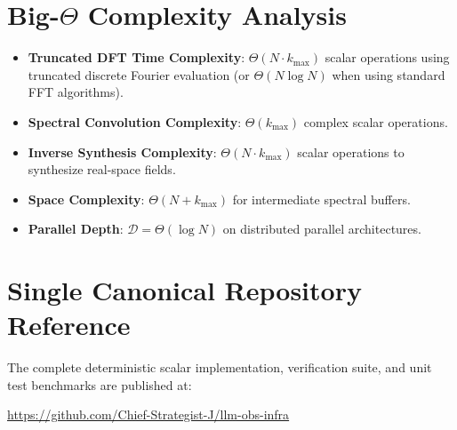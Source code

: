 \documentclass[11pt,a4paper]{article}
\theoremstyle{definition}
\begin{document}
\section{Big-$\Theta$ Complexity Analysis}

\begin{itemize}
    \item \textbf{Truncated DFT Time Complexity}: $\Theta(N \cdot k_{\max})$ scalar operations using truncated discrete Fourier evaluation (or $\Theta(N \log N)$ when using standard FFT algorithms).
    \item \textbf{Spectral Convolution Complexity}: $\Theta(k_{\max})$ complex scalar operations.
    \item \textbf{Inverse Synthesis Complexity}: $\Theta(N \cdot k_{\max})$ scalar operations to synthesize real-space fields.
    \item \textbf{Space Complexity}: $\Theta(N + k_{\max})$ for intermediate spectral buffers.
    \item \textbf{Parallel Depth}: $\mathcal{D} = \Theta(\log N)$ on distributed parallel architectures.
\end{itemize}

\section{Single Canonical Repository Reference}

The complete deterministic scalar implementation, verification suite, and unit test benchmarks are published at:
\begin{center}
\url{https://github.com/Chief-Strategist-J/llm-obs-infra}
\end{center}
\end{document}
